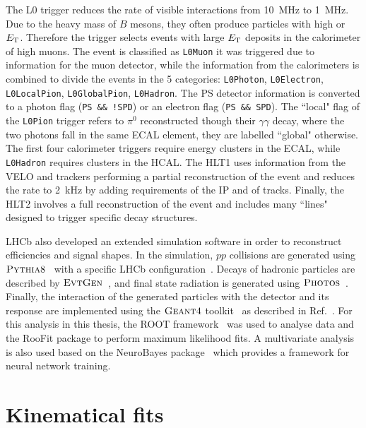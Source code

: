 The L0 trigger reduces the rate of visible interactions from 10~MHz to 1~MHz.
Due to the heavy mass of $B$ mesons, they often produce particles with high \pt or $E_{\rm T}$.
Therefore the trigger selects events with large $E_{\rm T}$ deposits in the calorimeter
of high \pt muons. The event is classified as \verb!L0Muon! it was triggered due to information
for the muon detector, while the information from the calorimeters is combined to divide the
events in the 5 categories: \verb!L0Photon!, \verb!L0Electron!, \verb!L0LocalPion!, 
\verb!L0GlobalPion!, \verb!L0Hadron!. The PS detector information is converted to a photon flag 
(\verb|PS && !SPD|) or an electron flag (\verb|PS && SPD|). The ``local" flag of the \verb!L0Pion! trigger 
refers to $\pi^0$ reconstructed though their $\gamma\gamma$ decay, where the two photons fall in the 
same ECAL element, they are labelled ``global" otherwise. The first four calorimeter triggers require 
energy clusters in the ECAL, while \verb!L0Hadron! requires clusters in the HCAL. 
The HLT1 uses information from the VELO and trackers performing a partial reconstruction 
of the event and reduces the rate to 2~kHz by adding requirements of the IP and \chisq of tracks.
Finally, the HLT2 involves a full reconstruction of the event and includes many ``lines" designed 
to trigger specific decay structures.

LHCb also developed an extended simulation software in order to reconstruct efficiencies and signal shapes.
In the simulation, $pp$ collisions are generated using $\textsc{Pythia}8$~\cite{Sjostrand:2006za} with a specific
LHCb configuration~\cite{LHCb-PROC-2010-056}. Decays of hadronic particles are described by $\textsc{EvtGen}$~\cite{Lange:2001uf},
and final state radiation is generated using $\textsc{Photos}$~\cite{Golonka:2005pn}. Finally, the interaction of the generated
particles with the detector and its response are implemented using the $\textsc{Geant4}$ toolkit~\cite{Allison:2006ve}
as described in Ref.~\cite{LHCb-PROC-2011-006}. For this analysis in this thesis, the ROOT framework~\cite{Brun:2000es} was
used to analyse data and the RooFit package to perform maximum likelihood fits. A multivariate analysis is also used
based on the NeuroBayes package~\cite{Feindt:2006pm,feindt-2004} which provides a framework for neural network training.

\section{Kinematical fits}
\label{sec:DTF}

